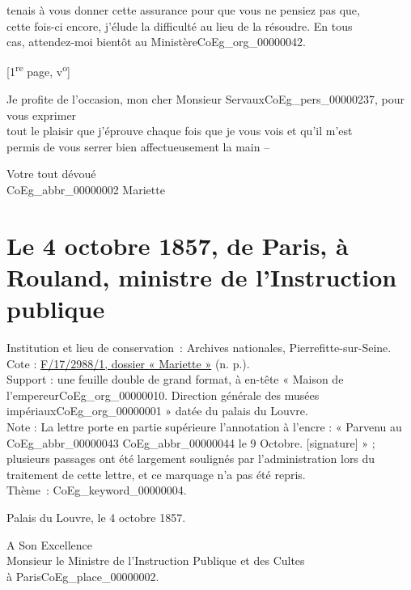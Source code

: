 \documentclass{book}
\begin{document}
{tenais à vous donner cette assurance pour que vous ne pensiez pas que,\\
cette fois-ci encore, j’élude la difficulté au lieu de la résoudre. En tous\\
cas, attendez-moi bientôt au Ministère\gls{CoEg_org_00000042}.
{\footnotesize\begin{center} {[1\textsuperscript{re} page, v\textsuperscript{o}]}\end{center}}
\indent Je profite de l’occasion, mon cher Monsieur Servaux\gls{CoEg_pers_00000237}, pour vous exprimer\\
tout le plaisir que j’éprouve chaque fois que je vous vois et qu’il m’est\\
permis de vous serrer bien affectueusement la main –
\begin{center}\hspace{5cm}Votre tout dévoué\\
\hspace{5cm}\gls{CoEg_abbr_00000002} Mariette\end{center}

\hypertarget{CoEg_Mariette_1857-10-04}{}

\section*{Le 4 octobre 1857, de Paris, à Rouland, ministre de l’Instruction publique}
 \label{labCoEg_Mariette_1857-10-04}
{\footnotesize
\noindent Institution et lieu de conservation~: Archives nationales, Pierrefitte-sur-Seine.\\
Cote : \hyperlink{CoEg_Mariette_ms_002}{F/17/2988/1, dossier « Mariette »} (n. p.).\\
Support : une feuille double de grand format, à en-tête « Maison de l’empereur\gls{CoEg_org_00000010}. Direction générale des musées impériaux\gls{CoEg_org_00000001} » datée du palais du Louvre.\\
Note : La lettre porte en partie supérieure l’annotation à l’encre : « Parvenu au \gls{CoEg_abbr_00000043} \gls{CoEg_abbr_00000044} le 9 Octobre. [signature] » ; plusieurs passages ont été largement soulignés par l’administration lors du traitement de cette lettre, et ce marquage n’a pas été repris.\\
Thème~: \gls{CoEg_keyword_00000004}.}

\begin{flushright}Palais du Louvre, le 4 octobre 1857.\end{flushright}
\indent A Son Excellence\\
\indent Monsieur le Ministre de l’Instruction Publique et des Cultes\\
\indent \hspace{5cm} à Paris\gls{CoEg_place_00000002}.\\

}
\end{document}

